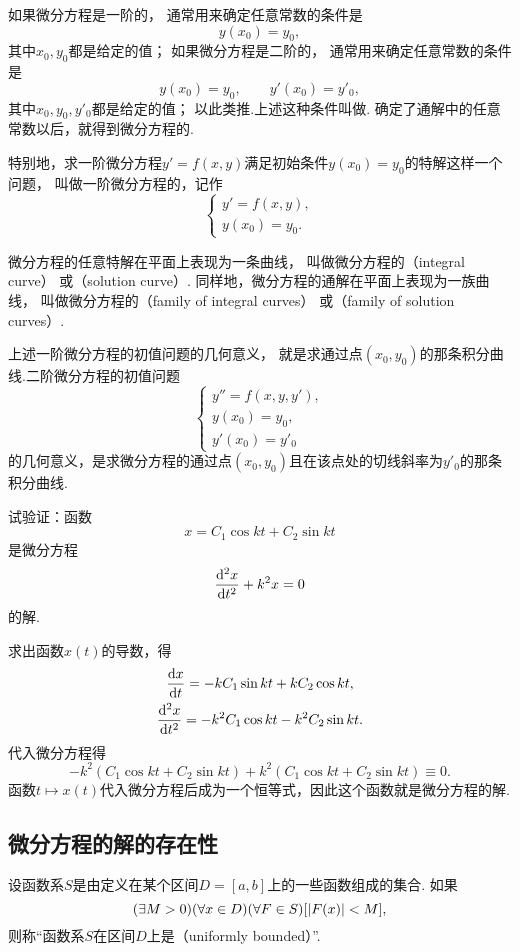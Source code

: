 如果微分方程是一阶的，
通常用来确定任意常数的条件是\[
	y(x_0) = y_0,
\]
其中\(x_0,y_0\)都是给定的值；
如果微分方程是二阶的，
通常用来确定任意常数的条件是\[
	y(x_0) = y_0,
	\qquad
	y'(x_0) = y'_0,
\]
其中\(x_0,y_0,y'_0\)都是给定的值；
以此类推.上述这种条件叫做.
确定了通解中的任意常数以后，就得到微分方程的.

特别地，求一阶微分方程\(y'=f(x,y)\)满足初始条件\(y(x_0) = y_0\)的特解这样一个问题，
叫做一阶微分方程的，记作\[
	\left\{ \begin{array}{l}
		y' = f(x,y), \\
		y(x_0) = y_0.
	\end{array} \right.
\]

微分方程的任意特解在平面上表现为一条曲线，
叫做微分方程的（integral curve）
或（solution curve）.
同样地，微分方程的通解在平面上表现为一族曲线，
叫做微分方程的（family of integral curves）
或（family of solution curves）.

上述一阶微分方程的初值问题的几何意义，
就是求通过点\((x_0,y_0)\)的那条积分曲线.二阶微分方程的初值问题\[
	\left\{ \begin{array}{l}
		y'' = f(x,y,y'), \\
		y(x_0) = y_0, \\
		y'(x_0) = y'_0
	\end{array} \right.
\]的几何意义，是求微分方程的通过点\((x_0,y_0)\)且在该点处的切线斜率为\(y'_0\)的那条积分曲线.

\begin{example}
试验证：函数\[
	x = C_1 \cos kt + C_2 \sin kt
\]是微分方程\[
	\dv[2]{x}{t} + k^2 x = 0
\]的解.
\begin{solution}
求出函数\(x(t)\)的导数，得\begin{gather*}
	\dv{x}{t} = -k C_1 \sin kt + k C_2 \cos kt, \\
	\dv[2]{x}{t} = -k^2 C_1 \cos kt - k^2 C_2 \sin kt.
\end{gather*}
代入微分方程得\[
	-k^2 (C_1 \cos kt + C_2 \sin kt) + k^2 (C_1 \cos kt + C_2 \sin kt)
	\equiv 0.
\]
函数\(t \mapsto x(t)\)代入微分方程后成为一个恒等式，因此这个函数就是微分方程的解.
\end{solution}
\end{example}

\subsection{微分方程的解的存在性}
\begin{definition}\label{definition:微分方程.函数系的一致有界性}
设函数系\(S\)是由定义在某个区间\(D = [a,b]\)上的一些函数组成的集合.
如果\[
	(\exists M>0)
	(\forall x \in D)
	(\forall F \in S)
	[\abs{F(x)} < M],
\]
则称“函数系\(S\)在区间\(D\)上是（uniformly bounded）”.
\end{definition}

